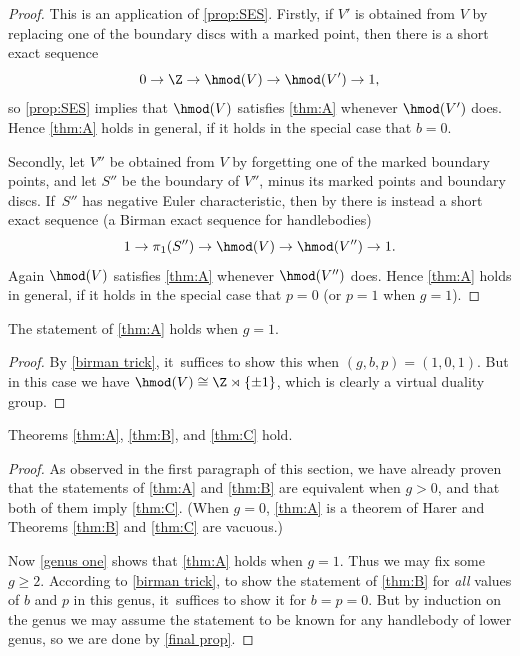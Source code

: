 \begin{proof}
This is an application of \cref{prop:SES}. Firstly, if $V'$ is obtained from $V$ by replacing one of the boundary discs with a marked point, then there is a short exact sequence
\[
0 \to \Z \to \hmod(V) \to \hmod(V')\to 1,
\]
so \cref{prop:SES} implies that $\hmod(V)$ satisfies \cref{thm:A} whenever $\hmod(V')$ does. Hence \cref{thm:A} holds in general, if it holds in the special case that $b=0$.

Secondly, let $V''$ be obtained from $V$ by forgetting one of the marked boundary points, and let $S''$ be the boundary of $V''$, minus its marked points and boundary discs. If~$S''$ has negative Euler characteristic, then by \cite[Lem.\,3.3]{hensel} there is instead a short exact sequence (a Birman exact sequence for handlebodies)
\[
1 \to \pi_1(S'') \to \hmod(V) \to \hmod(V'')\to 1.
\]
Again $\hmod(V)$ satisfies \cref{thm:A} whenever $\hmod(V'')$ does. Hence \cref{thm:A} holds in general, if it holds in the special case that $p=0$ (or $p=1$ when $g=1$).
\end{proof}

\begin{prop}\label{genus one}
The statement of \cref{thm:A} holds when $g=1$.
\end{prop}

\begin{proof}
By \cref{birman trick}, it~suffices to show this when $(g,b,p)=(1,0,1)$. But in this case we have $\hmod(V)\cong \Z \rtimes \{\pm 1\}$, which is clearly a virtual duality group.
\end{proof}

\begin{thm}
Theorems \ref{thm:A}, \ref{thm:B}, and \ref{thm:C} hold.
\end{thm}
\begin{proof}
As observed in the first paragraph of this section, we have already proven that the statements of \cref{thm:A} and \cref{thm:B} are equivalent when $g>0$, and that both of them imply \cref{thm:C}. (When $g=0$, \cref{thm:A} is a theorem of Harer and Theorems \ref{thm:B} and \ref{thm:C} are vacuous.)

Now \cref{genus one} shows that \cref{thm:A} holds when $g=1$. Thus we may fix some $g \geq 2$. According to \cref{birman trick}, to show the statement of \cref{thm:B} for \emph{all} values of $b$ and $p$ in this genus, it~suffices to show it for
$b=p=0$. But by induction on the genus we may assume the statement to be known for any handlebody of lower genus, so we are done by \cref{final prop}.
\end{proof}

